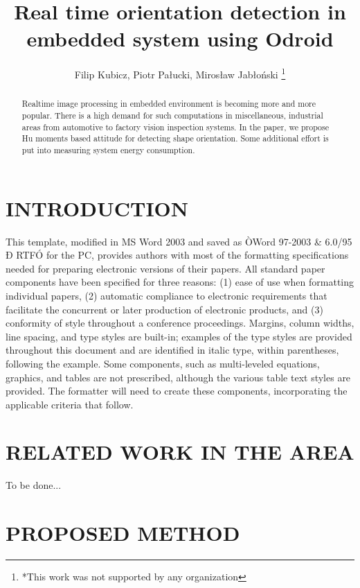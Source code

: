 \documentclass[letterpaper, 10 pt, conference]{ieeeconf}  %
\title{\LARGE \bf
Real time orientation detection in embedded system using Odroid
}
\author{Filip Kubicz, Piotr Pałucki, Mirosław Jabłoński%
\thanks{*This work was not supported by any organization}%
}
\begin{document}
\maketitle
\thispagestyle{empty}
\pagestyle{empty}


\begin{abstract}

Realtime image processing in embedded environment is becoming more and more popular.
There is a high demand for such computations in miscellaneous, industrial areas from automotive to factory vision inspection systems.
In the paper, we propose Hu moments based attitude for detecting shape orientation.
Some additional effort is put into measuring system energy consumption.
\end{abstract}


\section{INTRODUCTION}

This template, modified in MS Word 2003 and saved as ÒWord 97-2003 \& 6.0/95 Ð RTFÓ for the PC, provides authors with most of the formatting specifications needed for preparing electronic versions of their papers. All standard paper components have been specified for three reasons: (1) ease of use when formatting individual papers, (2) automatic compliance to electronic requirements that facilitate the concurrent or later production of electronic products, and (3) conformity of style throughout a conference proceedings. Margins, column widths, line spacing, and type styles are built-in; examples of the type styles are provided throughout this document and are identified in italic type, within parentheses, following the example. Some components, such as multi-leveled equations, graphics, and tables are not prescribed, although the various table text styles are provided. The formatter will need to create these components, incorporating the applicable criteria that follow.

\section{RELATED WORK IN THE AREA}

To be done...

\section{PROPOSED METHOD}
\end{document}
